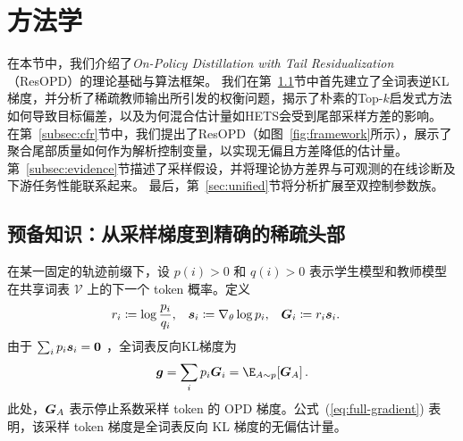 \section{方法学}
\label{sec:event}

在本节中，我们介绍了\textit{{O}n-{P}olicy {D}istillation with Tail {Res}idualization}（ResOPD）的理论基础与算法框架。  
我们在第~\ref{subsec:prelim}节中首先建立了全词表逆KL梯度，并分析了稀疏教师输出所引发的权衡问题，揭示了朴素的Top-$k$启发式方法如何导致目标偏差，以及为何混合估计量如HETS会受到尾部采样方差的影响。  
在第~\ref{subsec:cfr}节中，我们提出了ResOPD（如图~\ref{fig:framework}所示），展示了聚合尾部质量如何作为解析控制变量，以实现无偏且方差降低的估计量。  
第~\ref{subsec:evidence}节描述了采样假设，并将理论协方差界与可观测的在线诊断及下游任务性能联系起来。  
最后，第~\ref{sec:unified}节将分析扩展至双控制参数族。



\subsection{预备知识：从采样梯度到精确的稀疏头部}
\label{subsec:prelim}

在某一固定的轨迹前缀下，设 $p(i)>0$  和 $q(i)>0$ 表示学生模型和教师模型在共享词表 $\mathcal V$ 上的下一个 token 概率。定义
\begin{equation}
 \begin{aligned}
 r_i &\coloneqq \log\frac{p_i}{q_i}, &
 \bm{s}_i &\coloneqq \nabla_\theta\log p_i, &
 \bm{G}_i &\coloneqq r_i\bm{s}_i.
 \end{aligned}
 \label{eq:token-gradient}
\end{equation}
由于 $\sum_i p_i\bm{s}_i=\bm 0$ ，全词表反向KL梯度为
\begin{equation}
 \bgrad
 =\sum_i p_i\btoken_i
 =\E_{A\sim p}\!\left[\btoken_A\right].
 \label{eq:full-gradient}
\end{equation}
此处，$\bm{G}_A$ 表示停止系数采样 token 的 OPD 梯度。公式~(\ref{eq:full-gradient}) 表明，该采样 token 梯度是全词表反向 KL 梯度的无偏估计量。

